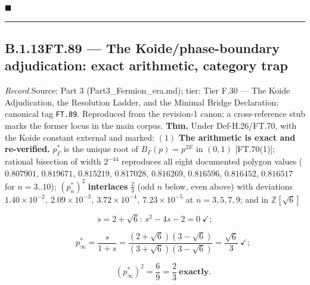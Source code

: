 \documentclass[11pt,openany]{report}
\theoremstyle{canonplain}
\theoremstyle{canondef}
\begin{document}
$\blacksquare$

\vspace{2pt}\noindent\rule{\textwidth}{0.4pt}\vspace{2pt}

\medskip
\subsection*{\texorpdfstring{B.1.13\quad FT.89 — The Koide/phase-boundary adjudication: exact arithmetic, category trap}{FT.89 B.1.13}}
\label{tag:FT-89}
{\small \textit{Record.}\quad Source: Part 3 (Part3\_Fermion\_era.md); tier: Tier F.30 — The Koide Adjudication, the Resolution Ladder, and the Minimal Bridge Declaration; canonical tag \texttt{FT.89}. Reproduced from the revision-1 canon; a cross-reference stub marks the former locus in the main corpus.}
\medskip
\textbf{Thm.} Under Def-H.26/FT.70, with the Koide constant external and marked: $(1)$ \textbf{The arithmetic is exact and re-verified.} $p^*_\Gamma$ is the unique root of $B_\Gamma(p)=p^{2E}$ in $(0,1)$ [FT.70(1)]; rational bisection of width $2^{-44}$ reproduces all eight documented polygon values ($0.807901$, $0.819671$, $0.815219$, $0.817028$, $0.816269$, $0.816596$, $0.816452$, $0.816517$ for $n=3..10$); $(p^*_n)^2$ \textbf{interlaces} $\tfrac23$ (odd $n$ below, even above) with deviations $1.40\times10^{-2},\ 2.09\times10^{-3},\ 3.72\times10^{-4},\ 7.23\times10^{-5}$ at $n=3,5,7,9$; and in $\mathbb Z[\sqrt6]$

\[
s=2+\sqrt6:\ s^2-4s-2=0\ \checkmark;
\]

\[
\qquad p^*_\infty=\frac{s}{1+s}=\frac{(2+\sqrt6)(3-\sqrt6)}{(3+\sqrt6)(3-\sqrt6)}=\frac{\sqrt6}{3}\ \checkmark;
\]

\[
\qquad (p^*_\infty)^2=\frac{6}{9}=\frac23\ \textbf{exactly}.
\]
\end{document}
